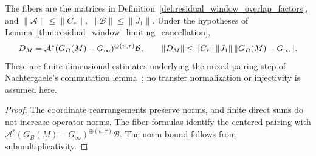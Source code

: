 \begin{lemma}
    \label{thm:residual_window_overlap_factors}
    \leanok
    The fibers are the matrices in Definition~\ref{def:residual_window_overlap_factors},
    and $\|\mathcal A\|\le\|C_r\|$, $\|\mathcal B\|\le\|J_1\|$.
    Under the hypotheses of Lemma~\ref{thm:residual_window_limiting_cancellation},
    \begin{align}
        D_M=\mathcal A^*(G_B(M)-G_\infty)^{\oplus(u,\tau)}\mathcal B,
        \qquad
        \|D_M\|\le\|C_r\|\,\|J_1\|\,\|G_B(M)-G_\infty\|.
        \notag
    \end{align}
    These are finite-dimensional estimates underlying the mixed-pairing step
    of Nachtergaele's commutation lemma~\cite{Nachtergaele1996Spectral}; no transfer
    normalization or injectivity is assumed here.
\end{lemma}
\begin{proof}\leanok
    The coordinate rearrangements preserve norms, and finite direct sums do not
    increase operator norms. The fiber formulas identify the centered pairing
    with $\mathcal A^*(G_B(M)-G_\infty)^{\oplus(u,\tau)}\mathcal B$.
    The norm bound follows from submultiplicativity.
\end{proof}

